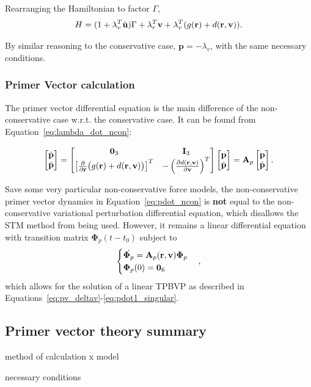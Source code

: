 Rearranging the Hamiltonian to factor \(\Gamma \), 
\begin{equation}
    H = (1 + \mathbf{\lambda}_v^T \hat{\mathbf{u}}) \Gamma + \mathbf{\lambda}_r^T \mathbf{v} + \mathbf{\lambda}_v^T (g(\mathbf{r}) + d(\mathbf{r}, \mathbf{v})).
\end{equation}

By similar reasoning to the conservative case, \(\mathbf{p} = - \lambda_v\), with the same necessary conditions. 

\subsubsection{Primer Vector calculation}

The primer vector differential equation is the main difference of the non-conservative case w.r.t. the conservative case. It can be found from Equation~\eqref{eq:lambda_dot_ncon}:

\begin{equation}\label{eq:pdot_ncon}
    \begin{bmatrix}
        \dot{\mathbf{p}} \\ \ddot{\mathbf{p}}
    \end{bmatrix} = \begin{bmatrix}
        \mathbf{0}_3 & \mathbf{I}_3 \\
        \left[\frac{\partial }{\partial \mathbf{r}}\big(g(\mathbf{r}) + d(\pos, \vel)\big)\right]^T & -\left(\frac{\partial d(\pos, \vel)}{\partial \vel}\right)^T
    \end{bmatrix} \begin{bmatrix}
        \mathbf{p} \\ \dot{\mathbf{p}}
    \end{bmatrix} = \mathbf{A}_p \begin{bmatrix}
        \mathbf{p} \\ \dot{\mathbf{p}}
    \end{bmatrix}.
\end{equation}

Save some very particular non-conservative force models, the non-conservative primer vector dynamics in Equation~\eqref{eq:pdot_ncon} is \textbf{not} equal to the non-conservative variational perturbation differential equation, which disallows the STM method from being used. However, it remains a linear differential equation with transition matrix \(\mathbf{\Phi}_p(t - t_0)\) subject to 
\begin{equation}
    \begin{cases}
        \dot{\mathbf{\Phi}_p} = \mathbf{A}_p(\mathbf{r}, \mathbf{v}) \mathbf{\Phi}_p \\
        \mathbf{\Phi}_p(0) = \mathbf{0}_6
    \end{cases},
\end{equation}
which allows for the solution of a linear TPBVP as described in Equations~\eqref{eq:pv_deltav}-\eqref{eq:pdot1_singular}.

\subsection{Primer vector theory summary}

method of calculation x model

necessary conditions